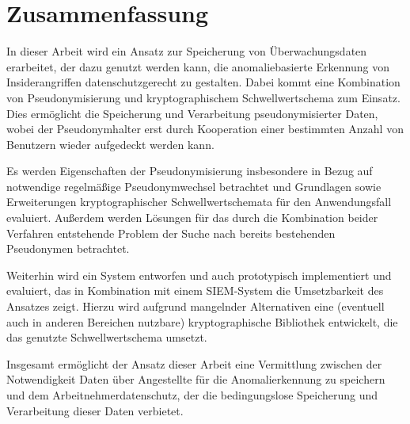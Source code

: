 \chapter*{Zusammenfassung}




In dieser Arbeit wird ein Ansatz zur Speicherung von Überwachungsdaten erarbeitet, der dazu genutzt werden kann, die anomaliebasierte Erkennung von Insiderangriffen datenschutzgerecht zu gestalten. Dabei kommt eine Kombination von Pseudonymisierung und kryptographischem Schwellwertschema zum Einsatz. Dies ermöglicht die Speicherung und Verarbeitung pseudonymisierter Daten, wobei der Pseudonymhalter erst durch Kooperation einer bestimmten Anzahl von Benutzern wieder aufgedeckt werden kann.

Es werden Eigenschaften der Pseudonymisierung insbesondere in Bezug auf notwendige regelmäßige Pseudonymwechsel betrachtet und Grundlagen sowie Erweiterungen kryptographischer Schwellwertschemata für den Anwendungsfall evaluiert. Außerdem werden Lösungen für das durch die Kombination beider Verfahren entstehende Problem der Suche nach bereits bestehenden Pseudonymen betrachtet.

Weiterhin wird ein System entworfen und auch prototypisch implementiert und evaluiert, das in Kombination mit einem SIEM-System die Umsetzbarkeit des Ansatzes zeigt. Hierzu wird aufgrund mangelnder Alternativen eine (eventuell auch in anderen Bereichen nutzbare) kryptographische Bibliothek entwickelt, die das genutzte Schwellwertschema umsetzt.

Insgesamt ermöglicht der Ansatz dieser Arbeit eine Vermittlung zwischen der Notwendigkeit Daten über Angestellte für die Anomalierkennung zu speichern und dem Arbeitnehmerdatenschutz, der die bedingungslose Speicherung und Verarbeitung dieser Daten verbietet.